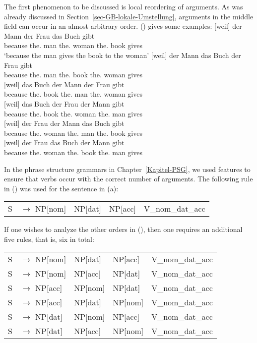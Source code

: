 The first phenomenon to be discussed is local reordering of arguments. As was already discussed in
Section~\ref{sec-GB-lokale-Umstellung}, arguments in the middle field can occur in an almost
arbitrary order. () gives some examples:
\eal
\label{bsp-GPSG-anordnung}
\ex 
\gll {}[weil] der Mann der Frau das Buch gibt\\
     {}\spacebr{}because the.\nom{} man the.\dat{} woman the.\acc{} book gives\\
\glt `because the man gives the book to the woman'
\ex 
\gll {}[weil] der Mann das Buch der Frau gibt\\
     {}\spacebr{}because the.\nom{} man the.\acc{} book the.\dat{} woman gives\\
\ex 
\gll {}[weil] das Buch der Mann der Frau gibt\\
{}\spacebr{}because the.\acc{} book the.\nom{} man the.\dat{} woman gives\\
\ex 
\gll {}[weil] das Buch der Frau der Mann gibt\\
{}\spacebr{}because the.\acc{} book the.\dat{} woman the.\nom{} man gives\\
\ex 
\gll {}[weil] der Frau der Mann das Buch gibt\\
{}\spacebr{}because the.\dat{} woman the.\nom{} man the.\acc{} book gives\\
\ex 
\gll {}[weil] der Frau das Buch der Mann gibt\\
{}\spacebr{}because the.\dat{} woman the.\acc{} book the.\nom{} man gives\\
\zl

\noindent
In the phrase structure grammars in Chapter~\ref{Kapitel-PSG}, we used features to ensure that verbs occur with the correct number of arguments. The following rule in () was
used for the sentence in (a):
\ea
\begin{tabular}[t]{@{}l@{ }l@{ }l@{ }l@{ }l@{ }}
S  & $\to$ NP[nom]& NP[dat] & NP[acc] & V\_nom\_dat\_acc\\
\end{tabular}
\z
If one wishes to analyze the other orders in (), then one requires an additional five rules, that is, six in total:
\ea
\label{Regeln-PSG-Abfolge}
\begin{tabular}[t]{@{}l@{ }l@{ }l@{ }l@{ }l@{ }}
S  & $\to$ NP[nom]& NP[dat] & NP[acc] & V\_nom\_dat\_acc\\
S  & $\to$ NP[nom]& NP[acc] & NP[dat] & V\_nom\_dat\_acc\\
S  & $\to$ NP[acc]& NP[nom] & NP[dat] & V\_nom\_dat\_acc\\
S  & $\to$ NP[acc]& NP[dat] & NP[nom] & V\_nom\_dat\_acc\\
S  & $\to$ NP[dat]& NP[nom] & NP[acc] & V\_nom\_dat\_acc\\
S  & $\to$ NP[dat]& NP[acc] & NP[nom] & V\_nom\_dat\_acc\\
\end{tabular}
\z

